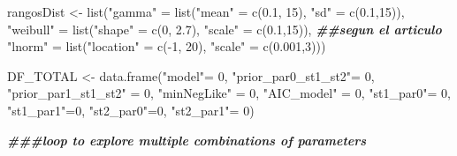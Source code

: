 \documentclass[
]{article}
\newenvironment{Shaded}{\begin{snugshade}}{\end{snugshade}}
\newcommand{\DecValTok}[1]{\textcolor[rgb]{0.00,0.00,0.81}{#1}}
\newcommand{\DocumentationTok}[1]{\textcolor[rgb]{0.56,0.35,0.01}{\textbf{\textit{#1}}}}
\newcommand{\FloatTok}[1]{\textcolor[rgb]{0.00,0.00,0.81}{#1}}
\newcommand{\FunctionTok}[1]{\textcolor[rgb]{0.00,0.00,0.00}{#1}}
\newcommand{\NormalTok}[1]{#1}
\newcommand{\OtherTok}[1]{\textcolor[rgb]{0.56,0.35,0.01}{#1}}
\newcommand{\SpecialCharTok}[1]{\textcolor[rgb]{0.00,0.00,0.00}{#1}}
\newcommand{\StringTok}[1]{\textcolor[rgb]{0.31,0.60,0.02}{#1}}
\begin{document}
\begin{Shaded}
\begin{Highlighting}[]
\NormalTok{rangosDist }\OtherTok{\textless{}{-}} \FunctionTok{list}\NormalTok{(}\StringTok{"gamma"} \OtherTok{=} \FunctionTok{list}\NormalTok{(}\StringTok{"mean"} \OtherTok{=} \FunctionTok{c}\NormalTok{(}\FloatTok{0.1}\NormalTok{, }\DecValTok{15}\NormalTok{), }\StringTok{"sd"} \OtherTok{=} \FunctionTok{c}\NormalTok{(}\FloatTok{0.1}\NormalTok{,}\DecValTok{15}\NormalTok{)), }
                   \StringTok{"weibull"} \OtherTok{=} \FunctionTok{list}\NormalTok{(}\StringTok{"shape"} \OtherTok{=} \FunctionTok{c}\NormalTok{(}\DecValTok{0}\NormalTok{, }\FloatTok{2.7}\NormalTok{), }\StringTok{"scale"} \OtherTok{=} \FunctionTok{c}\NormalTok{(}\FloatTok{0.1}\NormalTok{,}\DecValTok{15}\NormalTok{)),  }\DocumentationTok{\#\#segun el articulo}
                   \StringTok{"lnorm"} \OtherTok{=}  \FunctionTok{list}\NormalTok{(}\StringTok{"location"} \OtherTok{=} \FunctionTok{c}\NormalTok{(}\SpecialCharTok{{-}}\DecValTok{1}\NormalTok{, }\DecValTok{20}\NormalTok{), }\StringTok{"scale"} \OtherTok{=} \FunctionTok{c}\NormalTok{(}\FloatTok{0.001}\NormalTok{,}\DecValTok{3}\NormalTok{)))}

\NormalTok{DF\_TOTAL }\OtherTok{\textless{}{-}} \FunctionTok{data.frame}\NormalTok{(}\StringTok{"model"}\OtherTok{=} \DecValTok{0}\NormalTok{, }
            \StringTok{"prior\_par0\_st1\_st2"}\OtherTok{=} \DecValTok{0}\NormalTok{,}
            \StringTok{"prior\_par1\_st1\_st2"} \OtherTok{=} \DecValTok{0}\NormalTok{,}
           \StringTok{"minNegLike"} \OtherTok{=} \DecValTok{0}\NormalTok{,}
           \StringTok{"AIC\_model"} \OtherTok{=} \DecValTok{0}\NormalTok{,}
           \StringTok{"st1\_par0"}\OtherTok{=} \DecValTok{0}\NormalTok{,}
           \StringTok{"st1\_par1"}\OtherTok{=}\DecValTok{0}\NormalTok{,}
           \StringTok{"st2\_par0"}\OtherTok{=}\DecValTok{0}\NormalTok{,}
           \StringTok{"st2\_par1"}\OtherTok{=} \DecValTok{0}\NormalTok{)}


\DocumentationTok{\#\#\#loop to explore  multiple combinations of parameters}


\end{Highlighting}
\end{Shaded}
\end{document}
